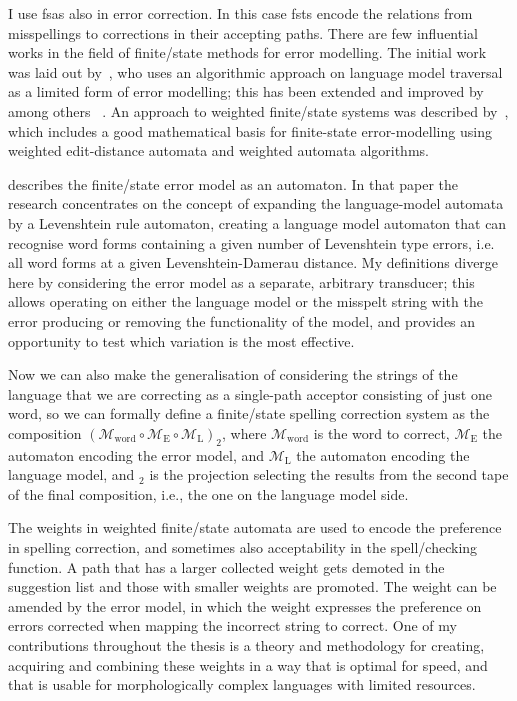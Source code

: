 \documentclass[officiallayout,final]{unihelcompling}
\begin{document}
I use \glspl{fsa} also in error correction. In this case \glspl{fst} encode the
relations from misspellings to corrections in their accepting paths. There are
few influential works in the field of finite\-/state methods for error
modelling. The initial work was laid out by~\citet{oflazer1996errortolerant},
who uses an algorithmic approach on language model traversal as a limited form
of error modelling; this has been extended and improved by among others
~\citet{hulden2009fast}.  An approach to weighted finite\-/state systems was
described by~\citet{mohri2003edit}, which includes a good mathematical basis
for finite-state error-modelling using weighted edit-distance automata and
weighted automata algorithms. 

\citet{agata2002typographical} describes the finite\-/state error model as an
automaton. In that paper the research concentrates on the concept of expanding
the language-model automata by a Levenshtein rule automaton, creating a
language model automaton that can recognise word forms containing a given
number of Levenshtein type errors, i.e. all word forms at a given
Levenshtein-Damerau distance. My definitions diverge here by considering the
error model as a separate, arbitrary transducer; this allows operating on
either the language model or the misspelt string with the error producing or
removing the functionality of the model, and provides an opportunity to test
which variation is the most effective. 

Now we can also make the generalisation of considering the strings of the
language that we are correcting as a single-path acceptor consisting of just
one word, so we can formally define a finite\-/state spelling correction system
as the composition $(\mathcal{M}_\mathrm{word} \circ \mathcal{M}_\mathrm{E}
\circ \mathcal{M}_\mathrm{L})_2$, where $\mathcal{M}_\mathrm{word}$ is the word
to correct, $\mathcal{M}_\mathrm{E}$ the automaton encoding the error model,
and $\mathcal{M}_\mathrm{L}$ the automaton encoding the language model, and
$_2$ is the projection selecting the results from the second tape of the final
composition, i.e., the one on the language model side.

The weights in weighted finite\-/state automata are used to encode the
preference in spelling correction, and sometimes also acceptability in the
spell\-/checking function. A path that has a larger collected weight gets
demoted in the suggestion list and those with smaller weights are promoted.
The weight can be amended by the error model, in which the weight expresses the
preference on errors corrected when mapping the incorrect string to correct.
One of my contributions throughout the thesis is a theory and methodology for
creating, acquiring and combining these weights in a way that is optimal for
speed, and that is usable for morphologically complex languages with limited
resources.
\end{document}
